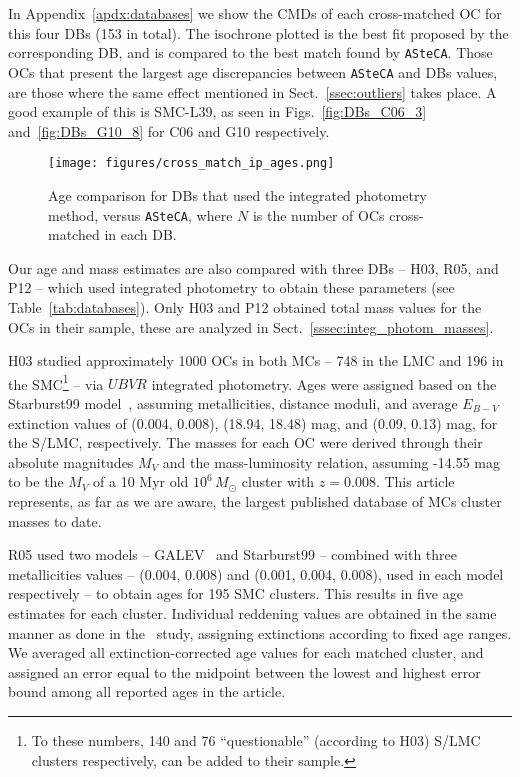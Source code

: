 \documentclass{aa}
\begin{document}
In Appendix~\ref{apdx:databases} we show the CMDs of each cross-matched OC for
this four DBs (153 in total). The isochrone plotted is the best fit proposed by
the corresponding DB, and is compared to the best match found by
\texttt{ASteCA}.
Those OCs that present the largest age discrepancies between \texttt{ASteCA} and
DBs values, are those where the same effect mentioned in
Sect.~\ref{ssec:outliers} takes place. A good example of this is SMC-L39, as
seen in Figs.~\ref{fig:DBs_C06_3} and~\ref{fig:DBs_G10_8} for C06 and G10
respectively.\\


%

\begin{figure}
\centering
\texttt{[image: figures/cross\_match\_ip\_ages.png]}
\caption{Age comparison for DBs that used the integrated photometry
method, versus \texttt{ASteCA}, where $N$ is the number of OCs cross-matched in
each DB.\@}
\label{fig:cross_match_ip_age}
\end{figure}

Our age and mass estimates are also compared with three DBs -- H03, R05, and P12
-- which used integrated photometry to obtain these parameters (see
Table~\ref{tab:databases}). Only H03 and P12 obtained total mass values for the
OCs in their sample, these are analyzed in
Sect.~\ref{sssec:integ_photom_masses}.

H03 studied approximately 1000 OCs in both MCs -- 748 in the LMC and 196 in the
SMC\footnote{To these numbers, 140 and 76 ``questionable'' (according to
H03) S/LMC clusters respectively, can be added to their sample.} --
via $UBVR$ integrated photometry. Ages were assigned based on the Starburst99
model~\citep{Leitherer_1999}, assuming metallicities, distance moduli, and
average $E_{B-V}$ extinction values of (0.004, 0.008), (18.94, 18.48) mag, and 
(0.09, 0.13) mag, for the S/LMC, respectively.
The masses for each OC were derived through their absolute
magnitudes $M_V$ and the mass-luminosity relation, assuming -14.55 mag to be the
$M_V$ of a 10 Myr old $10^6\,M_{\odot}$ cluster with $z=0.008$.
This article represents, as far as we are aware, the largest
published database of MCs cluster masses to date.

R05 used two models -- GALEV~\citep{Anders_2003} and Starburst99 -- combined
with three metallicities values -- (0.004, 0.008) and (0.001, 0.004, 0.008),
used in each model respectively -- to obtain ages for 195 SMC clusters.
This results in five age estimates for each cluster. Individual reddening
values are obtained in the same manner as done in the~\cite{Harris_2004} study,
assigning extinctions according to fixed age ranges.
%
We averaged all extinction-corrected age values for each matched cluster,
and assigned an error equal to the midpoint between the lowest and
highest error bound among all reported ages in the article.
\end{document}
